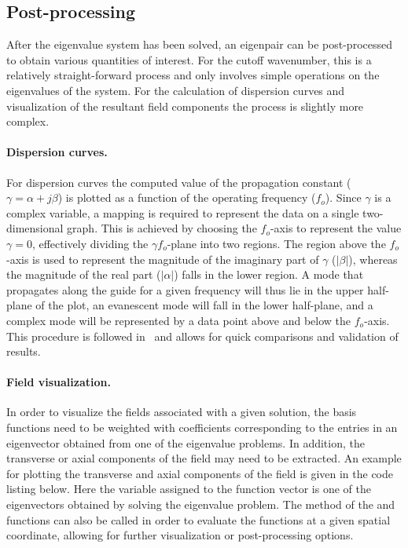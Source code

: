 \vspace*{2pt}
\subsection{Post-processing}

After the eigenvalue system has been solved, an eigenpair can
be post-processed to obtain various quantities of interest. For the
cutoff wavenumber, this is a relatively
straight-forward process and only involves simple operations on the
eigenvalues of the system. For the calculation of dispersion curves
and visualization of the resultant field components the process is
slightly more complex.

\paragraph{Dispersion curves.}

For dispersion curves the computed value of the propagation constant
($\gamma = \alpha + j\beta$) is plotted as a function of the operating
frequency ($f_o$). Since $\gamma$ is a complex variable, a mapping is
required to represent the data on a single two-dimensional graph. This
is achieved by choosing the $f_o$-axis to represent the value $\gamma
= 0$, effectively dividing the {$\gamma{f_o}$}-plane into two
regions. The region above the $f_o$-axis is used to represent the
magnitude of the imaginary part of $\gamma$ ($|\beta|$), whereas the
magnitude of the real part ($|\alpha|$) falls in the lower region. A
mode that propagates along the guide for a given frequency will thus
lie in the upper half-plane of the plot, an evanescent mode will fall
in the lower half-plane, and a complex mode will be represented by a
data point above and below the $f_o$-axis.  This procedure is followed
in~\citet{PelosiCoccioliSelleri1998} and allows for quick comparisons
and validation of results.

\paragraph{Field visualization.}

In order to visualize the fields associated with a given solution, the
basis functions need to be weighted with coefficients corresponding to
the entries in an eigenvector obtained from one of the eigenvalue
problems. In addition, the transverse or axial components of the field
may need to be extracted. An example for plotting the transverse and
axial components of the field is given in the code listing below.
Here the variable  assigned to the function vector is one of
the eigenvectors obtained by solving the eigenvalue
problem. The  method of the  and 
functions can also be called in order to evaluate the functions at a
given spatial coordinate, allowing for further visualization or
post-processing options.

